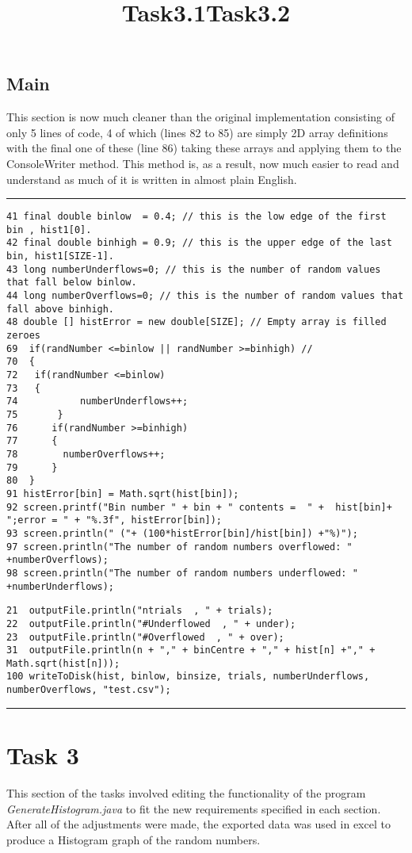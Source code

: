 \documentclass{article}
\begin{document}
\begin{multicols}{2}
			\subsection{Main}
			This section is now much cleaner than the original implementation consisting of only 5 lines of code, 4 of which (lines 82 to 85) are simply 2D array definitions with the final one of these (line 86) taking these arrays and applying them to the ConsoleWriter method. This method is, as a result, now much easier to read and understand as much of it is written in almost plain English.
\begin{table*}[t]
\hrule
\title{Task3.1}
\begin{lstlisting}
41 final double binlow  = 0.4; // this is the low edge of the first bin , hist1[0].       
42 final double binhigh = 0.9; // this is the upper edge of the last bin, hist1[SIZE-1].  
43 long numberUnderflows=0; // this is the number of random values that fall below binlow.
44 long numberOverflows=0; // this is the number of random values that fall above binhigh. 
48 double [] histError = new double[SIZE]; // Empty array is filled zeroes  
69  if(randNumber <=binlow || randNumber >=binhigh) // 
70  {
72 	 if(randNumber <=binlow)
73 	 {
74  		 numberUnderflows++;
75  	 }
76  	if(randNumber >=binhigh)
77  	{
78 		  numberOverflows++;
79  	}
80  }
91 histError[bin] = Math.sqrt(hist[bin]);
92 screen.printf("Bin number " + bin + " contents =  " +  hist[bin]+ ";error = " + "%.3f", histError[bin]);
93 screen.println(" ("+ (100*histError[bin]/hist[bin]) +"%)");               
97 screen.println("The number of random numbers overflowed: " +numberOverflows);
98 screen.println("The number of random numbers underflowed: " +numberUnderflows); 
\end{lstlisting}
\title{Task3.2}
\begin{lstlisting}
21  outputFile.println("ntrials  , " + trials); 
22  outputFile.println("#Underflowed  , " + under); 
23  outputFile.println("#Overflowed  , " + over); 
31  outputFile.println(n + "," + binCentre + "," + hist[n] +"," + Math.sqrt(hist[n]));
100 writeToDisk(hist, binlow, binsize, trials, numberUnderflows, numberOverflows, "test.csv"); 
\end{lstlisting}
\caption{These are the added lines of code for Tasks 3.1 and 3.2 }
\hrule
\end{table*}
\section{Task 3}
	This section of the tasks involved editing the functionality of the program \textit{GenerateHistogram.java} to fit the new requirements specified in each section. After all of the adjustments were made, the exported data was used in excel to produce a Histogram graph of the random numbers.

\end{multicols}
\end{document}
